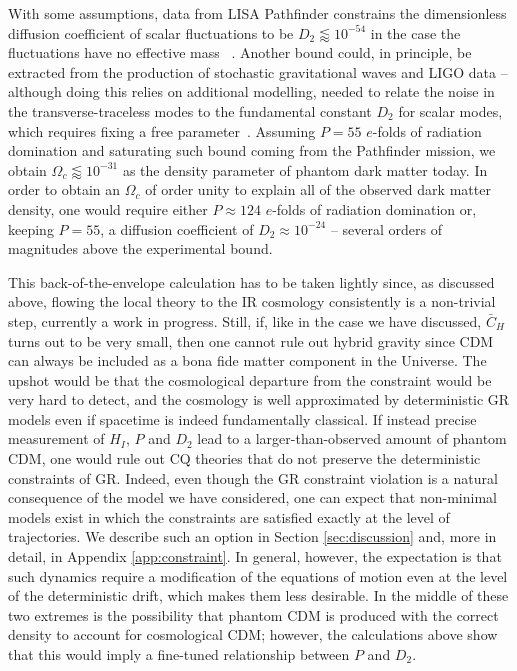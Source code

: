\documentclass[amsmath,amssymb,11pt]{article}
\begin{document}
With some assumptions, data from LISA Pathfinder constrains the dimensionless diffusion coefficient of scalar fluctuations to be $D_2\lessapprox 10^{-54}$ in the case the fluctuations have no effective mass ~\cite{grudka2024renormalisation}.
Another bound could, in principle, be extracted from the production of stochastic gravitational waves and LIGO data -- although doing this relies on additional modelling, needed to relate the noise in the transverse-traceless modes to the fundamental constant $D_2$ for scalar modes, which requires fixing a free parameter~\cite{grudka2024renormalisation,oppenheim2025diffusion}. Assuming $P=55$ $e$-folds of radiation domination and saturating such bound coming from the Pathfinder mission, we obtain $\Omega_c \lessapprox 10^{-31}$ as the density parameter of phantom dark matter today. In order to obtain an $\Omega_c$ of order unity to explain all of the observed dark matter density, one would require either $P\approx 124$ $e$-folds of radiation domination or, keeping $P=55$, a diffusion coefficient of $D_2\approx 10^{-24}$ -- several orders of magnitudes above the experimental bound.

This back-of-the-envelope calculation has to be taken lightly since, as discussed above, flowing the local theory to the IR cosmology consistently is a non-trivial step, currently a work in progress. Still, if, like in the case we have discussed, $\bar{C}_H$ turns out to be very small, then one cannot rule out hybrid gravity since CDM can always be included as a bona fide matter component in the Universe. The upshot would be that the cosmological departure from the constraint would be very hard to detect, and the cosmology is well approximated by deterministic GR models even if spacetime is indeed fundamentally classical. If instead precise measurement of $H_I$, $P$ and $D_2$ lead to a larger-than-observed amount of phantom CDM, one would rule out CQ theories that do not preserve the deterministic constraints of GR. Indeed, even though the GR constraint violation is a natural consequence of the model we have considered, one can expect that non-minimal models exist in which the constraints are satisfied exactly at the level of trajectories. We describe such an option in Section \ref{sec:discussion} and, more in detail, in Appendix \ref{app:constraint}. In general, however, the expectation is that such dynamics require a modification of the equations of motion even at the level of the deterministic drift, which makes them less desirable. In the middle of these two extremes is the possibility that phantom CDM is produced with the correct density to account for cosmological CDM; however, the calculations above show that this would imply a fine-tuned relationship between $P$ and $D_2$. 
\end{document}

